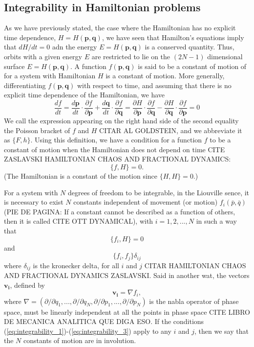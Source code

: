 \subsection{Integrability in Hamiltonian problems}
As we have previously stated, the case where the Hamiltonian has no explicit time dependence, $H=H(\bm{p},\bm{q})$, we have seen that Hamilton's equations imply that $dH/dt=0$ adn the energy $E=H(\bm{p},\bm{q})$ is a conserved quantity. Thus, orbits with a given energy $E$ are restricted to lie on the $(2N-1)$ dimensional surface $E=H(\bm{p},\bm{q})$. A function $f(\bm{p},\bm{q})$ is said to be a constant of motion of for a system with Hamiltonian $H$ is a constant of motion. More generally, differentiating $f(\bm{p},\bm{q})$ with respect to time, and assuming that there is no explicit time dependence of the Hamiltonian, we have
\begin{equation}
\frac{df}{dt}=\frac{d\bm{p}}{dt}\cdot\frac{\partial f}{\partial \bm{p}}+\frac{d\bm{q}}{dt}\cdot\frac{\partial f}{\partial \bm{q}}= \frac{\partial H}{\partial \bm{p}}\cdot\frac{\partial f}{\partial \bm{q}}-\frac{\partial H}{\partial \bm{q}}\cdot\frac{\partial f}{\partial \bm{p}}=0
\end{equation}
We call the expression appearing on the right hand side of the second equality the Poisson bracket of $f$ and $H$ CITAR AL GOLDSTEIN, and we abbreviate it as $\{F,h\}$. Using this definition, we have a condition for a function $f$ to be a constant of motion when the Hamiltonian does not depend on time CITE ZASLAVSKI HAMILTONIAN CHAOS AND FRACTIONAL DYNAMICS:
\begin{equation}
\{ f,H\} =0.
\end{equation}
(The Hamiltonian is a constant of the motion since $\{H,H\}=0$.)\par


For a system with $N$ degrees of freedom to be integrable, in the Liouville sence, it is necessary to exist $N$ constants independent of movement (or motion) $f_i(\bar{p},\bar{q})$(PIE DE PAGINA: If a constant cannot be described as a function of others, then it is called  CITE OTT DYNAMICAL), with $i=1,2,...,N$ in such a way that
\begin{equation}
\{f_i,H\}=0
\label{eq:integrability_1}
\end{equation}
and 
\begin{equation}
\{f_i,f_j\}\delta_{ij}
\label{eq:integrability_2}
\end{equation}
where $\delta_{ij}$ is the kronecker delta, for all $i$ and $j$ CITAR HAMILTONIAN CHAOS AND FRACTIONAL DYNAMICS ZASLAVSKI. Said in another wat, the vectors $\bm{v_i}$, defined by
\begin{equation}
\bm{v_i}=\nabla f_i,
\label{eq:integrability_3}
\end{equation}
where $\nabla=(\partial/\partial q_1,...,\partial/\partial q_N,\partial/\partial p_1,...,\partial/\partial p_N)$ is the nabla operator of phase space, must be linearly independent at all the points in phase space CITE LIBRO DE MECANICA ANALITICA QUE DIGA ESO. If the conditions (\ref{eq:integrability_1})-(\ref{eq:integrability_3}) apply to any $i$ and $j$, then we say that the $N$ constants of motion are in involution.\par 

